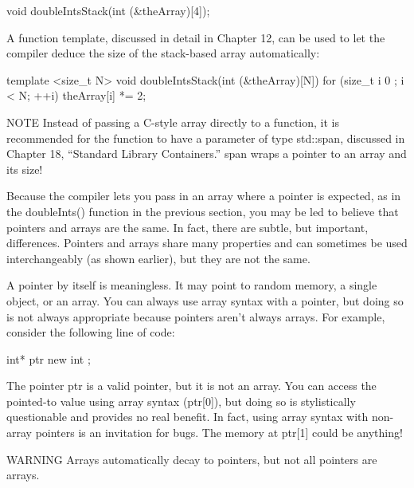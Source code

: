 \begin{cpp}
void doubleIntsStack(int (&theArray)[4]);
\end{cpp}

A function template, discussed in detail in Chapter 12, can be used to let the compiler deduce the size of the stack-based array automatically:

\begin{cpp}
template <size_t N>
void doubleIntsStack(int (&theArray)[N])
{
    for (size_t i { 0 }; i < N; ++i) { theArray[i] *= 2; }
}
\end{cpp}

\begin{myNotic}{NOTE}
Instead of passing a C-style array directly to a function, it is recommended for the function to have a parameter of type std::span, discussed in Chapter 18, “Standard Library Containers.” span wraps a pointer to an array and its size!
\end{myNotic}


Because the compiler lets you pass in an array where a pointer is expected, as in the doubleInts() function in the previous section, you may be led to believe that pointers and arrays are the same. In fact, there are subtle, but important, differences. Pointers and arrays share many properties and can sometimes be used interchangeably (as shown earlier), but they are not the same.

A pointer by itself is meaningless. It may point to random memory, a single object, or an array. You can always use array syntax with a pointer, but doing so is not always appropriate because pointers aren’t always arrays. For example, consider the following line of code:

\begin{cpp}
int* ptr { new int };
\end{cpp}

The pointer ptr is a valid pointer, but it is not an array. You can access the pointed-to value using array syntax (ptr[0]), but doing so is stylistically questionable and provides no real benefit. In fact, using array syntax with non-array pointers is an invitation for bugs. The memory at ptr[1] could be anything!

\begin{myWarning}{WARNING}
Arrays automatically decay to pointers, but not all pointers are arrays.
\end{myWarning}











